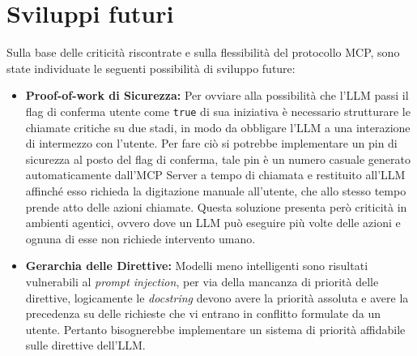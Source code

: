 \section{Sviluppi futuri}
Sulla base delle criticità riscontrate e sulla flessibilità del protocollo MCP, sono state individuate le seguenti possibilità di sviluppo future:
\begin{itemize}
    \item \textbf{Proof-of-work di Sicurezza:} Per ovviare alla possibilità che l'LLM passi il flag di conferma utente come \texttt{true} di sua iniziativa è necessario strutturare le chiamate critiche su due stadi, in modo da obbligare l'LLM a una interazione di intermezzo con l'utente. Per fare ciò si potrebbe implementare un pin di sicurezza al posto del flag di conferma, tale pin è un numero casuale generato automaticamente dall'MCP Server a tempo di chiamata e restituito all'LLM affinché esso richieda la digitazione manuale all'utente, che allo stesso tempo prende atto delle azioni chiamate. Questa soluzione presenta però criticità in ambienti agentici, ovvero dove un LLM può eseguire più volte delle azioni e ognuna di esse non richiede intervento umano.
    \item \textbf{Gerarchia delle Direttive:} Modelli meno intelligenti sono risultati vulnerabili al \textit{prompt injection}, per via della mancanza di priorità delle direttive, logicamente le \textit{docstring} devono avere la priorità assoluta e avere la precedenza su delle richieste che vi entrano in conflitto formulate da un utente. Pertanto bisognerebbe implementare un sistema di priorità affidabile sulle direttive dell'LLM.
\end{itemize}